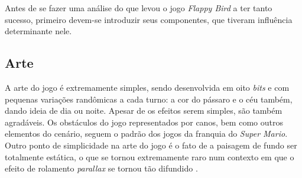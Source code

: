 Antes de se fazer uma análise do que levou o jogo \textit{Flappy Bird} a ter tanto sucesso, primeiro devem-se introduzir seus componentes, que tiveram influência determinante nele.

\subsection{Arte}
A arte do jogo é extremamente simples, sendo desenvolvida em oito \textit{bits} e com pequenas variações randômicas a cada turno: a cor do pássaro e o céu também, dando ideia de dia ou noite. Apesar de os efeitos serem simples, são também agradáveis. Os obstáculos do jogo representados por canos, bem como outros elementos do cenário, seguem o padrão dos jogos da franquia do \textit{Super Mario}. Outro ponto de simplicidade na arte do jogo é o fato de a paisagem de fundo ser totalmente estática, o que se tornou extremamente raro num contexto em que o efeito de rolamento \textit{parallax} se tornou tão difundido \cite{Eldic2014}.